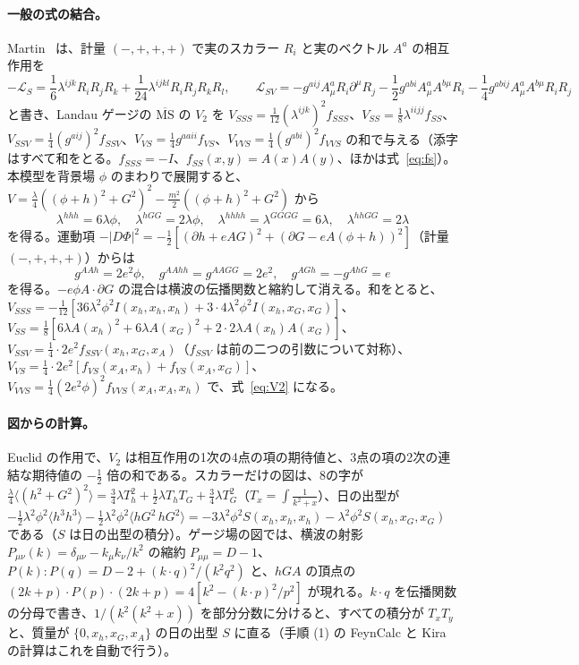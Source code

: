 \documentclass[a4paper,10pt]{ltjsarticle}
\newcommand{\MSbar}{\overline{\mathrm{MS}}}
\begin{document}
\paragraph{一般の式の結合。}Martin~\cite{martin01} は、計量 $(-,+,+,+)$ で実のスカラー $R_i$ と実のベクトル $A^a$ の相互作用を
\begin{equation*}
-\mathcal L_S=\frac16\lambda^{ijk}R_iR_jR_k+\frac1{24}\lambda^{ijkl}R_iR_jR_kR_l,\qquad
\mathcal L_{SV}=-g^{aij}A^a_\mu R_i\partial^\mu R_j-\frac12g^{abi}A^a_\mu A^{b\mu}R_i-\frac14g^{abij}A^a_\mu A^{b\mu}R_iR_j
\end{equation*}
と書き、Landau ゲージの $\MSbar$ の $V_2$ を $V_{SSS}=\frac1{12}(\lambda^{ijk})^2f_{SSS}$、$V_{SS}=\frac18\lambda^{iijj}f_{SS}$、$V_{SSV}=\frac14(g^{aij})^2f_{SSV}$、$V_{VS}=\frac14g^{aaii}f_{VS}$、$V_{VVS}=\frac14(g^{abi})^2f_{VVS}$ の和で与える（添字はすべて和をとる。$f_{SSS}=-I$、$f_{SS}(x,y)=A(x)A(y)$、ほかは式~\eqref{eq:fs}）。本模型を背景場 $\phi$ のまわりで展開すると、$V=\frac\lambda4((\phi+h)^2+G^2)^2-\frac{m^2}2((\phi+h)^2+G^2)$ から
\begin{equation*}
\lambda^{hhh}=6\lambda\phi,\quad \lambda^{hGG}=2\lambda\phi,\quad \lambda^{hhhh}=\lambda^{GGGG}=6\lambda,\quad \lambda^{hhGG}=2\lambda
\end{equation*}
を得る。運動項 $-|D\Phi|^2=-\frac12[(\partial h+eAG)^2+(\partial G-eA(\phi+h))^2]$（計量 $(-,+,+,+)$）からは
\begin{equation*}
g^{AAh}=2e^2\phi,\quad g^{AAhh}=g^{AAGG}=2e^2,\quad g^{AGh}=-g^{AhG}=e
\end{equation*}
を得る。$-e\phi A\cdot\partial G$ の混合は横波の伝播関数と縮約して消える。和をとると、$V_{SSS}=-\frac1{12}[36\lambda^2\phi^2I(x_h,x_h,x_h)+3\cdot4\lambda^2\phi^2I(x_h,x_G,x_G)]$、$V_{SS}=\frac18[6\lambda A(x_h)^2+6\lambda A(x_G)^2+2\cdot2\lambda A(x_h)A(x_G)]$、$V_{SSV}=\frac14\cdot2e^2f_{SSV}(x_h,x_G,x_A)$（$f_{SSV}$ は前の二つの引数について対称）、$V_{VS}=\frac14\cdot2e^2[f_{VS}(x_A,x_h)+f_{VS}(x_A,x_G)]$、$V_{VVS}=\frac14(2e^2\phi)^2f_{VVS}(x_A,x_A,x_h)$ で、式~\eqref{eq:V2} になる。

\paragraph{図からの計算。}Euclid の作用で、$V_2$ は相互作用の1次の4点の項の期待値と、3点の項の2次の連結な期待値の $-\frac12$ 倍の和である。スカラーだけの図は、8の字が $\frac\lambda4\langle(h^2+G^2)^2\rangle=\frac34\lambda T_h^2+\frac12\lambda T_hT_G+\frac34\lambda T_G^2$（$T_x=\int\frac1{k^2+x}$）、日の出型が $-\frac12\lambda^2\phi^2\langle h^3h^3\rangle-\frac12\lambda^2\phi^2\langle hG^2\,hG^2\rangle=-3\lambda^2\phi^2S(x_h,x_h,x_h)-\lambda^2\phi^2S(x_h,x_G,x_G)$ である（$S$ は日の出型の積分）。ゲージ場の図では、横波の射影 $P_{\mu\nu}(k)=\delta_{\mu\nu}-k_\mu k_\nu/k^2$ の縮約 $P_{\mu\mu}=D-1$、$P(k){:}P(q)=D-2+(k\cdot q)^2/(k^2q^2)$ と、$hGA$ の頂点の $(2k+p)\!\cdot\!P(p)\!\cdot\!(2k+p)=4[k^2-(k\cdot p)^2/p^2]$ が現れる。$k\cdot q$ を伝播関数の分母で書き、$1/(k^2(k^2+x))$ を部分分数に分けると、すべての積分が $T_xT_y$ と、質量が $\{0,x_h,x_G,x_A\}$ の日の出型 $S$ に直る（手順 (1) の FeynCalc と Kira の計算はこれを自動で行う）。
\end{document}
